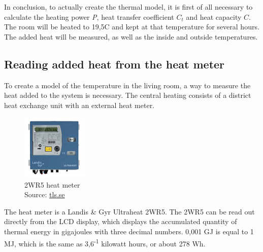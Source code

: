 \documentclass[12pt,a4paper,final]{report}
\newcommand*{\captionsource}[2]{%
  \caption[{#1}]{%
    #1%
    \\\hspace{\linewidth}%
    Source: #2%
  }%
}
\begin{document}
In conclusion, to actually create the thermal model, it is first of all necessary to calculate the heating power \textit{P}, heat transfer coefficient $C_{t}$ and heat capacity $C$. The room will be heated to 19,5\degree{}C and kept at that temperature for several hours. The added heat will be measured, as well as the inside and outside temperatures.

\subsection{Reading added heat from the heat meter}
To create a model of the temperature in the living room, a way to measure the heat added to the system is necessary. The central heating consists of a district heat exchange unit with an external heat meter. 

\begin{figure}
  \vspace{-33pt}
  \begin{center}
      \includegraphics[width=0.28\textwidth]{2WR5}
  \end{center}
  \vspace{-20pt}
  \captionsource{2WR5 heat meter}{\url{tls.se}}
\end{figure}
The heat meter is a Landis \& Gyr Ultraheat 2WR5. The 2WR5 can be read out directly from the LCD display, which displays the accumulated quantity of thermal energy in gigajoules with three decimal numbers. 0,001 GJ is equal to 1 MJ, which is the same as 3,6\textsuperscript{-1} kilowatt hours, or about 278 Wh.
\end{document}
